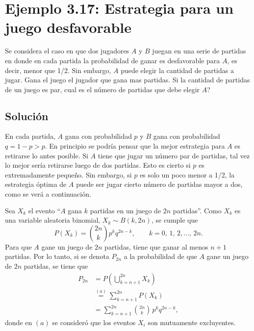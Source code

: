 \documentclass[a4paper]{report}
\begin{document}
\section{Ejemplo 3.17: Estrategia para un juego desfavorable}

Se considera el caso en que dos jugadores \(A\) y \(B\) juegan en una serie de partidas en donde en cada partida la probabilidad de ganar es desfavorable para \(A\), es decir, menor que 1/2. Sin embargo, \(A\) puede elegir la cantidad de partidas a jugar. Gana el juego el jugador que gana mas partidas. Si la cantidad de partidas de un juego es par, cual es el número de partidas que debe elegir \(A\)?

\subsection{Solución}

En cada partida, \(A\) gana con probabilidad \(p\) y \(B\) gana con probabilidad \(q=1-p>p\). En principio se podría pensar que la mejor estrategia para \(A\) es retirarse lo antes posible. Si \(A\) tiene que jugar un número par de partidas, tal vez lo mejor sería retirarse luego de dos partidas. Esto es cierto si \(p\) es extremadamente pequeño. Sin embargo, si \(p\) es solo un poco menor a 1/2, la estrategia óptima de \(A\) puede ser jugar cierto número de partidas mayor a dos, como se verá a continuación.

Sea \(X_k\) el evento ``\(A\) gana \(k\) partidas en un juego de \(2n\) partidas''. Como \(X_k\) es una variable aleatoria binomial, \(X_k\sim B(k,2n)\), se cumple que
\[
 P(X_k)=\binom{2n}{k}p^kq^{2n-k},\qquad k=0,\,1,\,2,\dots,\,2n.
\]
Para que \(A\) gane un juego de \(2n\) partidas, tiene que ganar al menos \(n+1\) partidas. Por lo tanto, si se denota \(P_{2n}\) a la probabilidad de que \(A\) gane un juego de \(2n\) partidas, se tiene que
\begin{align}\label{eq:unfair_p2n}
 P_{2n}&=P\left(\bigcup\limits_{k=n+1}^{2n}X_k\right)\nonumber\\
    &\overset{(a)}=\sum_{k=n+1}^{2n}P(X_k)\nonumber\\
    &=\sum_{k=n+1}^{2n}\binom{2n}{k}\,p^kq^{2n-k},
\end{align}
donde en \((a)\) se consideró que los eventos \(X_i\) son mutuamente excluyentes.
\end{document}
